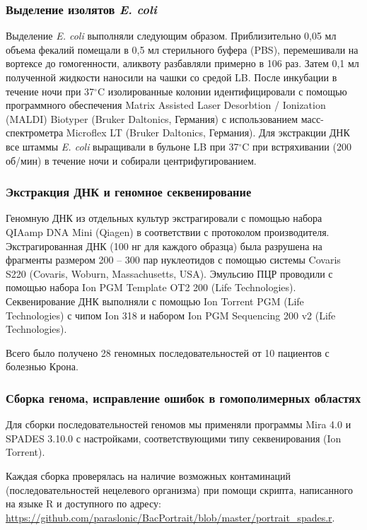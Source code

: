 \subsubsection*{Выделение изолятов \textit{E. coli}}

Выделение \textit{E. coli} выполняли следующим образом. Приблизительно 0,05 мл объема фекалий помещали в 0,5 мл стерильного буфера (PBS), перемешивали на вортексе до гомогенности, аликвоту разбавляли примерно в 106 раз. Затем 0,1 мл полученной жидкости наносили на чашки со средой LB. После инкубации в течение ночи при 37$^\circ$C изолированные колонии идентифицировали с помощью программного обеспечения Matrix Assisted Laser Desorbtion / Ionization (MALDI) Biotyper (Bruker Daltonics, Германия) с использованием масс-спектрометра Microflex LT (Bruker Daltonics, Германия). Для экстракции ДНК все штаммы \textit{E. coli} выращивали в бульоне LB при 37$^\circ$C при встряхивании (200 об/мин) в течение ночи и собирали центрифугированием.

\subsubsection*{Экстракция ДНК и геномное секвенирование}

Геномную ДНК из отдельных культур экстрагировали с помощью набора QIAamp DNA Mini (Qiagen) в соответствии с протоколом производителя. Экстрагированная ДНК (100 нг для каждого образца) была разрушена на фрагменты размером 200 – 300 пар нуклеотидов с помощью системы Covaris S220 (Covaris, Woburn, Massachusetts, USA). Эмульсию ПЦР проводили с помощью набора Ion PGM Template OT2 200 (Life Technologies). Секвенирование ДНК выполняли с помощью Ion Torrent PGM (Life Technologies) с чипом Ion 318 и набором Ion PGM Sequencing 200 v2 (Life Technologies). 

Всего было получено 28 геномных последовательностей от 10 пациентов с болезнью Крона.

\subsubsection*{Сборка генома, исправление ошибок в гомополимерных областях}
Для сборки последовательностей геномов мы применяли программы Mira 4.0 и SPADES 3.10.0 с настройками, соответствующими типу секвенирования (Ion Torrent).

Каждая сборка проверялась на наличие возможных контаминаций (последовательностей нецелевого организма) при помощи скрипта, написанного на языке R и доступного по адресу: \url{https://github.com/paraslonic/BacPortrait/blob/master/portrait\_spades.r}. 

